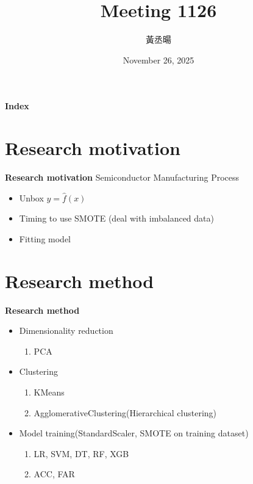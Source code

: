 \documentclass[12pt,aspectratio=43]{beamer}
\title{Meeting 1126}
\author{黃丞暘}
\institute{國立東華大學應數統計所}
\date{November 26, 2025}
\begin{document}
\begin{frame}
  \titlepage
\end{frame}

\begin{frame}{\textbf{Index}}
  \tableofcontents
\end{frame}

\section{Research motivation}

\begin{frame}{\textbf{Research motivation}}
\linespread{1.5}
  Semiconductor Manufacturing Process
  \begin{itemize}
    \item Unbox $y = \hat{f}(x)$
  \end{itemize}
  \begin{itemize}
    \item Timing to use SMOTE (deal with imbalanced data)
  \end{itemize}
  \begin{itemize}
    \item Fitting model
  \end{itemize}
\end{frame}

\section{Research method}

\begin{frame}{\textbf{Research method}}
\linespread{1.5}
  \begin{itemize}[]
    \item Dimensionality reduction
      \begin{enumerate}[]
        \item PCA
      \end{enumerate}
    \item Clustering
      \begin{enumerate}[]
        \item KMeans
        \item AgglomerativeClustering(Hierarchical clustering)
      \end{enumerate}
    \item Model training(StandardScaler, SMOTE on training dataset)
      \begin{enumerate}
        \item LR, SVM, DT, RF, XGB
        \item ACC, FAR
      \end{enumerate}
  \end{itemize}
\end{frame}
\end{document}
